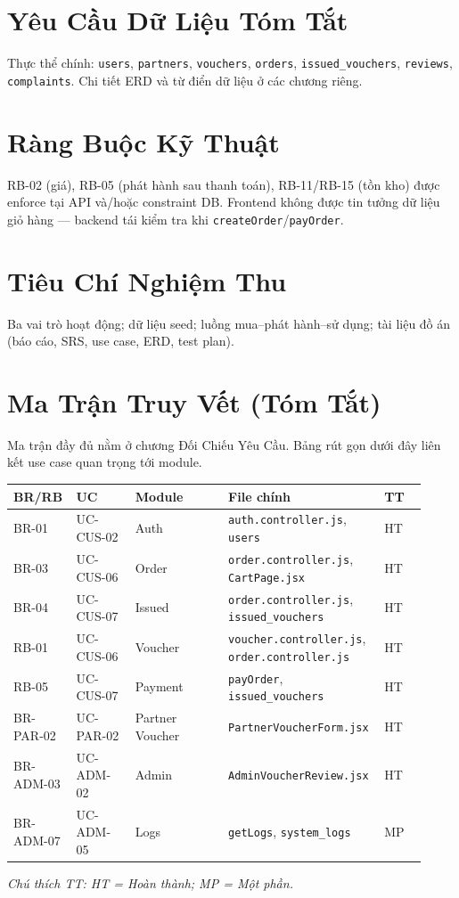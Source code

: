 \section{Yêu Cầu Dữ Liệu Tóm Tắt}
Thực thể chính: \texttt{users}, \texttt{partners}, \texttt{vouchers}, \texttt{orders}, \texttt{issued\_vouchers}, \texttt{reviews}, \texttt{complaints}. Chi tiết ERD và từ điển dữ liệu ở các chương riêng.

\section{Ràng Buộc Kỹ Thuật}
RB-02 (giá), RB-05 (phát hành sau thanh toán), RB-11/RB-15 (tồn kho) được enforce tại API và/hoặc constraint DB. Frontend không được tin tưởng dữ liệu giỏ hàng — backend tái kiểm tra khi \texttt{createOrder}/\texttt{payOrder}.

\section{Tiêu Chí Nghiệm Thu}
Ba vai trò hoạt động; dữ liệu seed; luồng mua--phát hành--sử dụng; tài liệu đồ án (báo cáo, SRS, use case, ERD, test plan).

\section{Ma Trận Truy Vết (Tóm Tắt)}
Ma trận đầy đủ nằm ở chương Đối Chiếu Yêu Cầu. Bảng rút gọn dưới đây liên kết use case quan trọng tới module.

\small
\begin{longtable}{>{\raggedright\arraybackslash}p{0.12\linewidth}>{\raggedright\arraybackslash}p{0.14\linewidth}>{\raggedright\arraybackslash}p{0.22\linewidth}>{\raggedright\arraybackslash}p{0.34\linewidth}>{\raggedright\arraybackslash}p{0.10\linewidth}}
\toprule
\textbf{BR/RB} & \textbf{UC} & \textbf{Module} & \textbf{File chính} & \textbf{TT}\\
\midrule
\endhead
BR-01 & UC-CUS-02 & Auth & \texttt{auth.controller.js}, \texttt{users} & HT\\
BR-03 & UC-CUS-06 & Order & \texttt{order.controller.js}, \texttt{CartPage.jsx} & HT\\
BR-04 & UC-CUS-07 & Issued & \texttt{order.controller.js}, \texttt{issued\_vouchers} & HT\\
RB-01 & UC-CUS-06 & Voucher & \texttt{voucher.controller.js}, \texttt{order.controller.js} & HT\\
RB-05 & UC-CUS-07 & Payment & \texttt{payOrder}, \texttt{issued\_vouchers} & HT\\
BR-PAR-02 & UC-PAR-02 & Partner Voucher & \texttt{PartnerVoucherForm.jsx} & HT\\
BR-ADM-03 & UC-ADM-02 & Admin & \texttt{AdminVoucherReview.jsx} & HT\\
BR-ADM-07 & UC-ADM-05 & Logs & \texttt{getLogs}, \texttt{system\_logs} & MP\\
\bottomrule
\end{longtable}
\normalsize
\textit{Chú thích TT: HT = Hoàn thành; MP = Một phần.}

